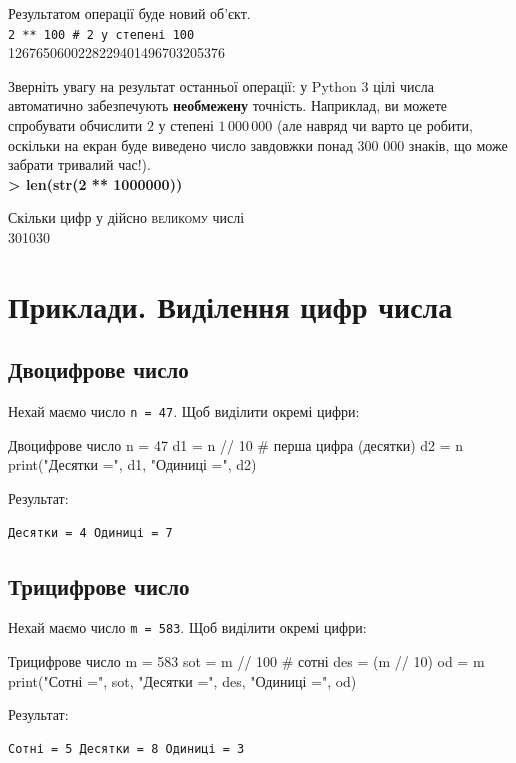 	Результатом операції буде новий об'єкт. \\
	\texttt{2 ** 100 \# 2 у степені 100}\\ 
	1267650600228229401496703205376 
	
	Зверніть увагу на результат останньої операції: у Python 3 цілі числа автоматично забезпечують \textbf{необмежену} точність. Наприклад, ви можете спробувати обчислити $2$ у степені $1\,000\,000$ (але навряд чи варто це робити, оскільки на екран буде виведено число завдовжки понад 300 000 знаків, що може забрати тривалий час!).\\
	
	\textbf{ > len(str(2 ** 1000000))} 
	
	Скільки цифр у дійсно \textsc{великому} числі\\
	301030
		
	\section{Приклади. Виділення цифр числа}
	
	\subsection*{Двоцифрове число} Нехай маємо число \texttt{n = 47}.  	Щоб виділити окремі цифри:
	
	\begin{py}{Двоцифрове число}
n = 47
d1 = n // 10   # перша цифра (десятки)
d2 = n %
print("Десятки =", d1, "Одиниці =", d2)
	\end{py}
	
	Результат:
	\begin{verbatim}
Десятки = 4 Одиниці = 7
	\end{verbatim}
	
	\subsection*{Трицифрове число}
	
	Нехай маємо число \texttt{m = 583}.  
	Щоб виділити окремі цифри:
	
	\begin{py}{Трицифрове число}
m = 583
sot = m // 100          # сотні
des = (m // 10) %
od = m %
print("Сотні =", sot, "Десятки =", des, "Одиниці =", od)
	\end{py}
	
	Результат:
	\begin{verbatim}
Сотні = 5 Десятки = 8 Одиниці = 3
	\end{verbatim}
	
